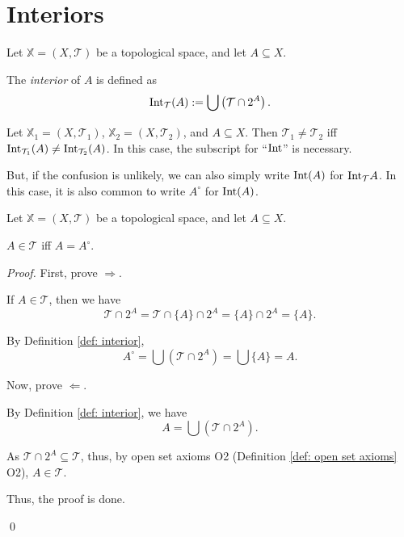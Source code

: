 \section{Interiors}


\begin{definition}
	\label{def: interior}
	Let $\mathbb X = (X, \mathcal T)$ be a topological space, and let $A \subseteq X$.
	
	The \textit{interior} of $A$ is defined as
	$$
	\mathrm{Int}_{\mathcal T}(A) := \bigcup \left(\mathcal T \cap 2^A \right).
	$$
\end{definition}


\begin{note}
	Let $\mathbb X_1 = (X, \mathcal T_1)$, $\mathbb X_2 = (X, \mathcal T_2)$, and $A \subseteq X$. Then $\mathcal T_1 \ne \mathcal T_2$ iff $\mathrm{Int}_{\mathcal T_1}(A) \ne \mathrm{Int}_{\mathcal T_2}(A)$. In this case, the subscript for ``$\mathrm{Int}$'' is necessary.
	
	But, if the confusion is unlikely, we can also simply write $\mathrm{Int} (A)$ for $\mathrm{Int}_\mathcal T A$. In this case, it is also common to write $A^\circ$ for $\mathrm{Int}(A)$.
\end{note}


\begin{proposition}
	\label{prop: open iff interior}
	Let $\mathbb X = (X, \mathcal T)$ be a topological space, and let $A \subseteq X$.
	
	$A \in \mathcal T$ iff $A = A^\circ$.
	
	\begin{proof}
		First, prove $\Rightarrow$.
		
		If $A \in \mathcal T$, then we have
		$$
		\mathcal T \cap 2^A = \mathcal T \cap \{A\} \cap 2^A = \{A\} \cap 2^A = \{A\}.
		$$
		
		By Definition \ref{def: interior},
		$$
		A^\circ = \bigcup(\mathcal T \cap 2^A) = \bigcup\{A\} = A.
		$$
		
		\qedlm
		
		Now, prove $\Leftarrow$.
		
		By Definition \ref{def: interior}, we have
		$$
		A = \bigcup(\mathcal T \cap 2^A).
		$$
		
		As $\mathcal T \cap 2^A \subseteq \mathcal T$, thus, by open set axioms O2 (Definition \ref{def: open set axioms} O2), $A \in \mathcal T$.
		
		\qedlm
		
		Thus, the proof is done.
		
		\qed
	\end{proof}
\end{proposition}


